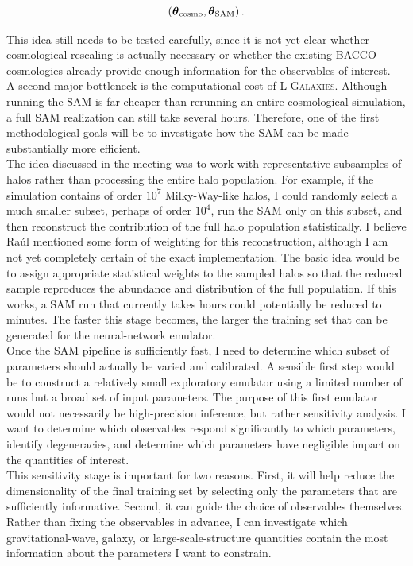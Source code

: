 \documentclass[10.9pt,a4paper,twoside]{article}
\begin{document}
\[
\left(
\boldsymbol{\theta}_{\rm cosmo},
\boldsymbol{\theta}_{\rm SAM}
\right).
\]

This idea still needs to be tested carefully, since it is not yet clear whether cosmological rescaling is actually necessary or whether the existing BACCO cosmologies already provide enough information for the observables of interest. \\

A second major bottleneck is the computational cost of \textsc{L-Galaxies}. Although running the SAM is far cheaper than rerunning an entire cosmological simulation, a full SAM realization can still take several hours. Therefore, one of the first methodological goals will be to investigate how the SAM can be made substantially more efficient. \\

The idea discussed in the meeting was to work with representative subsamples of halos rather than processing the entire halo population. For example, if the simulation contains of order $10^7$ Milky-Way-like halos, I could randomly select a much smaller subset, perhaps of order $10^4$, run the SAM only on this subset, and then reconstruct the contribution of the full halo population statistically. I believe Raúl mentioned some form of weighting for this reconstruction, although I am not yet completely certain of the exact implementation. The basic idea would be to assign appropriate statistical weights to the sampled halos so that the reduced sample reproduces the abundance and distribution of the full population. If this works, a SAM run that currently takes hours could potentially be reduced to minutes. The faster this stage becomes, the larger the training set that can be generated for the neural-network emulator. \\

Once the SAM pipeline is sufficiently fast, I need to determine which subset of parameters should actually be varied and calibrated. A sensible first step would be to construct a relatively small exploratory emulator using a limited number of runs but a broad set of input parameters. The purpose of this first emulator would not necessarily be high-precision inference, but rather sensitivity analysis. I want to determine which observables respond significantly to which parameters, identify degeneracies, and determine which parameters have negligible impact on the quantities of interest. \\

This sensitivity stage is important for two reasons. First, it will help reduce the dimensionality of the final training set by selecting only the parameters that are sufficiently informative. Second, it can guide the choice of observables themselves. Rather than fixing the observables in advance, I can investigate which gravitational-wave, galaxy, or large-scale-structure quantities contain the most information about the parameters I want to constrain. \\
\end{document}
